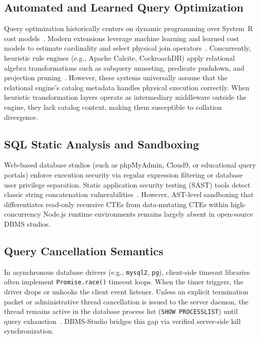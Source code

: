 \documentclass[conference]{IEEEtran}
\begin{document}
\subsection{Automated and Learned Query Optimization}
Query optimization historically centers on dynamic programming over System~R cost models~\cite{selinger1979access}. Modern extensions leverage machine learning and learned cost models to estimate cardinality and select physical join operators~\cite{marcus2019neo, zhou2020learned}. Concurrently, heuristic rule engines (e.g., Apache Calcite, CockroachDB) apply relational algebra transformations such as subquery unnesting, predicate pushdown, and projection pruning~\cite{graefe1993volcano}. However, these systems universally assume that the relational engine's catalog metadata handles physical execution correctly. When heuristic transformation layers operate as intermediary middleware outside the engine, they lack catalog context, making them susceptible to collation divergence.

\subsection{SQL Static Analysis and Sandboxing}
Web-based database studios (such as phpMyAdmin, Cloud9, or educational query portals) enforce execution security via regular expression filtering or database user privilege separation. Static application security testing (SAST) tools detect classic string concatenation vulnerabilities~\cite{haley2008security}. However, AST-level sandboxing that differentiates read-only recursive CTEs from data-mutating CTEs within high-concurrency Node.js runtime environments remains largely absent in open-source DBMS studios.

\subsection{Query Cancellation Semantics}
In asynchronous database drivers (e.g., \texttt{mysql2}, \texttt{pg}), client-side timeout libraries often implement \texttt{Promise.race()} timeout loops. When the timer triggers, the driver drops or unhooks the client event listener. Unless an explicit termination packet or administrative thread cancellation is issued to the server daemon, the thread remains active in the database process list (\texttt{SHOW PROCESSLIST}) until query exhaustion~\cite{mysql80reference}. DBMS-Studio bridges this gap via verified server-side kill synchronization.
\end{document}
